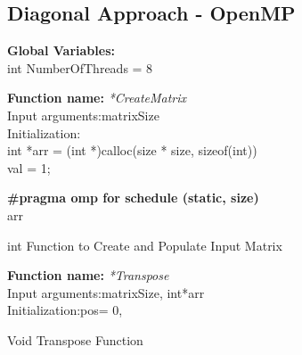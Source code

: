 \documentclass[10pt,journal]{article}
\begin{document}
\vspace{20pt}
\subsection{Diagonal Approach - OpenMP}
\textbf{Global Variables:} \\
int NumberOfThreads = 8\\
\vspace{10pt}
\begin{algorithm}[H]
\SetAlgoLined
\textbf{Function name:} \emph{*CreateMatrix}\\\vspace{10pt}
Input arguments:\:matrixSize\\
Initialization\::\\
int *arr = (int *)calloc(size * size, sizeof(int))\\
val = 1;

\vspace{10pt} 
\textbf{\#pragma omp for schedule (static, size)}\\
\Return arr
\caption{int Function to Create and Populate Input Matrix}
\end{algorithm}

\begin{algorithm}[H]
\SetAlgoLined
\textbf{Function name:} \emph{*Transpose}\\\vspace{10pt}
Input arguments:\:matrixSize, int*arr\\
Initialization\::pos= 0,\\

\vspace{10pt} 
\caption{Void Transpose Function}
\end{algorithm}
\end{document}
